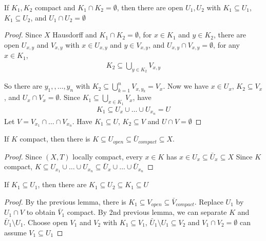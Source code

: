 \begin{lemma}
	If $K_{1}, K_{2}$ compact and $K_{1} \cap K_2 = \emptyset$, then there are open $U_{1} , U_{2}$ with $K_{1} \subseteq U_{1}$, $K_{1} \subseteq U_{2}$, and $U_1 \cap U_2 = \emptyset$
\end{lemma}

\begin{proof}
	Since $X$ Hausdorff and $K_1 \cap K_2 = \emptyset$, for $x \in K_1$ and $y \in K_2$,
	there are open $U_{x,y}$ and $V_{x,y}$ with $x \in U_{x,y}$ and $y \in V_{x,y}$,
	and $U_{x,y} \cap V_{x,y} = \emptyset$, for any $x \in K_1$,
	\begin{align*}
		K_2 \subseteq \bigcup_{y \in K_2} V_{x,y}
	\end{align*}

	So there are $y_1, ,\ldots , y_n$ with $K_2 \subseteq \bigcup_{k=1}^n V_{x, y_{k}} = V_{x}$.
	Now we have $x \in U_{x}$, $K_2 \subseteq V_x$, and $U_{x} \cap V_{x} = \emptyset$. Since $K_{1} \subseteq \bigcup_{x \in K_1} V_x$, have
	\begin{align*}
		K_1 \subseteq U_{x} \cup \ldots \cup U_{x_{n}} = U
	\end{align*}
	Let $V = V_{x_{1}} \cap \ldots \cap V_{x_{n}}$. Have $K_{1} \subseteq U$, $K_{2} \subseteq V$ and $U \cap V = \emptyset$
\end{proof}

\begin{lemma}
	If $K$ compact, then there is $K \subseteq U_{open} \subseteq \bar{U}_{compact} \subseteq X$.
\end{lemma}

\begin{proof}
	Since $(X,T)$ locally compact, every $x \in K$ has $x \in U_{x} \subseteq \bar{U}_x \subseteq X$
	Since $K$ compact, $K \subseteq U_{x_1} \cup \ldots \cup U_{x_n} \subseteq \bar{U}_x \cup \ldots \cup \bar{U}_{x_{n}}$
\end{proof}

\begin{lemma}
	If $K_1 \subseteq U_1$, then there are  $K_1 \subseteq U_{2} \subseteq K_1 \subseteq U$
\end{lemma}

\begin{proof}
	By the previous lemma, there is $K_1 \subseteq V_{open} \subseteq \bar{V}_{compact}$.
	Replace $U_{1}$ by $U_{1} \cap V$ to obtain $\bar{V}_{1}$ compact. By 2nd previous lemma, we can separate $K$ and $\bar{U}_1 \setminus U_{1}$.
	Choose open $V_1$ and $V_2$ with $K_{1} \subseteq V_{1}$,  $\bar{U}_1 \setminus U_1 \subseteq V_{2}$
	and $V_{1} \cap V_{2} = \emptyset$ can assume $V_{1} \subseteq U_{1}$
\end{proof}

